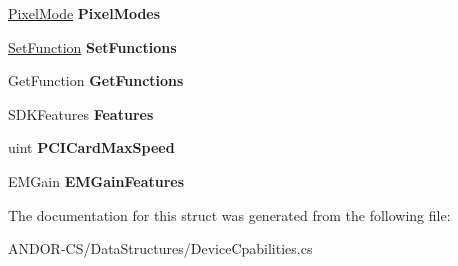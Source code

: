 \begin{DoxyCompactItemize}
\hyperlink{namespace_a_n_d_o_r___c_s_1_1_enums_ab38791738171af186b6574cad8dbdb85}{Pixel\+Mode} {\bfseries Pixel\+Modes}
\item 
\mbox{\label{struct_a_n_d_o_r___c_s_1_1_data_structures_1_1_device_cpabilities_a6614ac86c81ab5e1f5db5ce4b4c3f9c2}} 
\hyperlink{namespace_a_n_d_o_r___c_s_1_1_enums_aa01affb880df1c0e299b6208ef101d56}{Set\+Function} {\bfseries Set\+Functions}
\item 
\mbox{\label{struct_a_n_d_o_r___c_s_1_1_data_structures_1_1_device_cpabilities_a699b2851d591990f3403d9ba7bbfcdd8}} 
Get\+Function {\bfseries Get\+Functions}
\item 
\mbox{\label{struct_a_n_d_o_r___c_s_1_1_data_structures_1_1_device_cpabilities_ab628de22305374af61970d67256c45da}} 
S\+D\+K\+Features {\bfseries Features}
\item 
\mbox{\label{struct_a_n_d_o_r___c_s_1_1_data_structures_1_1_device_cpabilities_ab3cb6b16ee8205e7a3162757a1d5f57f}} 
uint {\bfseries P\+C\+I\+Card\+Max\+Speed}
\item 
\mbox{\label{struct_a_n_d_o_r___c_s_1_1_data_structures_1_1_device_cpabilities_a906a1e9298957a5d1511eef95d5a016a}} 
E\+M\+Gain {\bfseries E\+M\+Gain\+Features}
\end{DoxyCompactItemize}


The documentation for this struct was generated from the following file\+:\begin{DoxyCompactItemize}
\item 
A\+N\+D\+O\+R-\/\+C\+S/\+Data\+Structures/Device\+Cpabilities.\+cs\end{DoxyCompactItemize}

